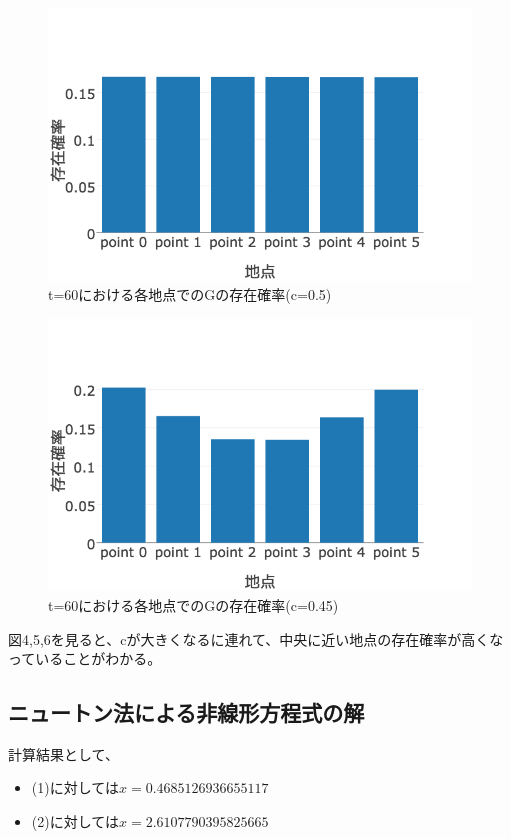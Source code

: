 \documentclass[11pt]{ltjsarticle}
\begin{document}
	\begin{figure}
  		\includegraphics[width=\textwidth]{fig5.png}
  		\caption{ t=60における各地点でのGの存在確率(c=0.5)}
	\end{figure}

	\begin{figure}
  		\includegraphics[width=\textwidth]{fig6.png}
  		\caption{ t=60における各地点でのGの存在確率(c=0.45)}
	\end{figure}

	図4,5,6を見ると、cが大きくなるに連れて、中央に近い地点の存在確率が高くなっていることがわかる。
\subsection{ニュートン法による非線形方程式の解}

計算結果として、

\begin{itemize}
	\item (1)に対しては$x = 0.4685126936655117$
	\item (2)に対しては$x = 2.6107790395825665$
\end{itemize}
\end{document}

